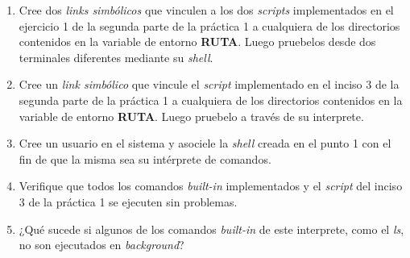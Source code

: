 \begin{enumerate}
	  \item Cree dos \textit{links simbólicos} que vinculen a los dos \textit{scripts} implementados en el ejercicio 1 de la segunda parte de la práctica 1 a cualquiera de los directorios contenidos en la variable de entorno \textbf{RUTA}. Luego pruebelos desde dos terminales diferentes mediante su \textit{shell}.

      \item Cree un \textit{link simbólico} que vincule el \textit{script} implementado en el inciso 3 de la segunda parte de la práctica 1 a cualquiera de los directorios contenidos en la variable de entorno \textbf{RUTA}. Luego pruebelo a través de su interprete.
      
      \item Cree un usuario en el sistema y asociele la \textit{shell} creada en el punto 1 con el fin de que la misma sea su intérprete de comandos.
      
      \item Verifique que todos los comandos \textit{built-in} implementados y el \textit{script} del inciso 3 de la práctica 1 se ejecuten sin problemas.

      \item ¿Qué sucede si algunos de los comandos \textit{built-in} de este interprete, como el \textit{ls}, no son ejecutados en \textit{background}?

\end{enumerate}